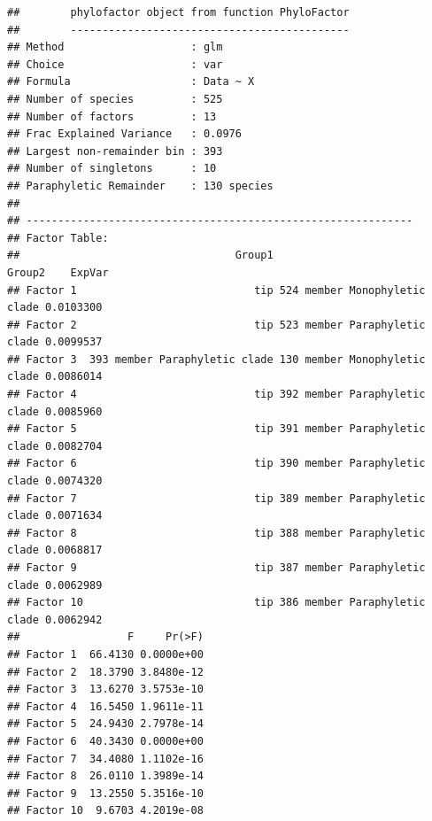 \documentclass[
]{book}
\begin{document}
\begin{verbatim}
##        phylofactor object from function PhyloFactor
##        --------------------------------------------       
## Method                    : glm
## Choice                    : var
## Formula                   : Data ~ X
## Number of species         : 525
## Number of factors         : 13
## Frac Explained Variance   : 0.0976
## Largest non-remainder bin : 393
## Number of singletons      : 10
## Paraphyletic Remainder    : 130 species
##                   
## -------------------------------------------------------------
## Factor Table:
##                                  Group1                        Group2    ExpVar
## Factor 1                            tip 524 member Monophyletic clade 0.0103300
## Factor 2                            tip 523 member Paraphyletic clade 0.0099537
## Factor 3  393 member Paraphyletic clade 130 member Monophyletic clade 0.0086014
## Factor 4                            tip 392 member Paraphyletic clade 0.0085960
## Factor 5                            tip 391 member Paraphyletic clade 0.0082704
## Factor 6                            tip 390 member Paraphyletic clade 0.0074320
## Factor 7                            tip 389 member Paraphyletic clade 0.0071634
## Factor 8                            tip 388 member Paraphyletic clade 0.0068817
## Factor 9                            tip 387 member Paraphyletic clade 0.0062989
## Factor 10                           tip 386 member Paraphyletic clade 0.0062942
##                 F     Pr(>F)
## Factor 1  66.4130 0.0000e+00
## Factor 2  18.3790 3.8480e-12
## Factor 3  13.6270 3.5753e-10
## Factor 4  16.5450 1.9611e-11
## Factor 5  24.9430 2.7978e-14
## Factor 6  40.3430 0.0000e+00
## Factor 7  34.4080 1.1102e-16
## Factor 8  26.0110 1.3989e-14
## Factor 9  13.2550 5.3516e-10
## Factor 10  9.6703 4.2019e-08
\end{verbatim}
\end{document}
